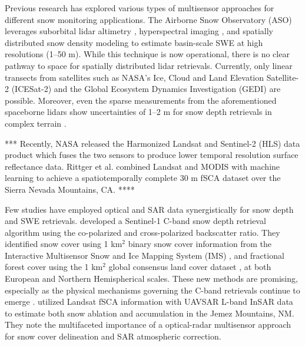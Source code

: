 Previous research has explored various types of multisensor approaches for different snow monitoring applications. The Airborne Snow Observatory (ASO) \citep{painterAirborneSnowObservatory2016} leverages suborbital lidar altimetry \citep{deemsLidarMeasurementSnow2013}, hyperspectral imaging \citep{nolinMappingAlpineSnow1993}, and spatially distributed snow density modeling \citep{marksSpatiallyDistributedEnergy1999,hedrickDirectInsertionNASA2018a,meyerOperationalWaterForecast2023a} to estimate basin-scale SWE at high resolutions (1--50 m). While this technique is now operational, there is no clear pathway to space for spatially distributed lidar retrievals. Currently, only linear transects from satellites such as NASA's Ice, Cloud and Land Elevation Satellite-2 (ICESat-2) \citep{abdalatiICESat2LaserAltimetry2010} and the Global Ecosystem Dynamics Investigation (GEDI) \citep{dubayahGlobalEcosystemDynamics2020} are possible. Moreover, even the sparse measurements from the aforementioned spaceborne lidars show uncertainties of 1--2 m for snow depth retrievals in complex terrain \citep{enderlinUncertaintyICESat2ATL062022, deschamps-bergerEvaluationSnowDepth2022}. 

*** Recently, NASA released the Harmonized Landsat and Sentinel-2 (HLS) data product which fuses the two sensors to produce lower temporal resolution surface reflectance data.
Rittger et al. \citep{rittgerMultisensorFusionUsing2021} combined Landsat and MODIS with machine learning to achieve a spatiotemporally complete 30 m fSCA dataset over the Sierra Nevada Mountains, CA. ****

Few studies have employed optical and SAR data synergistically for snow depth and SWE retrievals. \cite{lievensSnowDepthVariability2019,lievensSentinel1SnowDepth2022} developed a Sentinel-1 C-band snow depth retrieval algorithm using the co-polarized and cross-polarized backscatter ratio. They identified snow cover using 1 km$^{2}$ binary snow cover information from the Interactive Multisensor Snow and Ice Mapping System (IMS) \citep{u.s.nationalicecenterIMSDailyNorthern2008, ramsayInteractiveMultisensorSnow1998, helfrichEnhancementsForthcomingDevelopments2007}, and fractional forest cover using the 1 km$^{2}$ global consensus land cover dataset \citep{tuanmuGlobal1kmConsensus2014}, at both European and Northern Hemispherical scales. These new methods are promising, especially as the physical mechanisms governing the C-band retrievals continue to emerge \citep{zhuModelingScatteringDense2023}. \cite{tarriconeEstimatingSnowAccumulation2023a} utilized Landsat fSCA information with UAVSAR \citep{hensleyUAVSARInstrumentDescription2008} L-band InSAR data to estimate both snow ablation and accumulation in the Jemez Mountains, NM. They note the multifaceted importance of a optical-radar multisensor approach for snow cover delineation and SAR atmospheric correction. 

